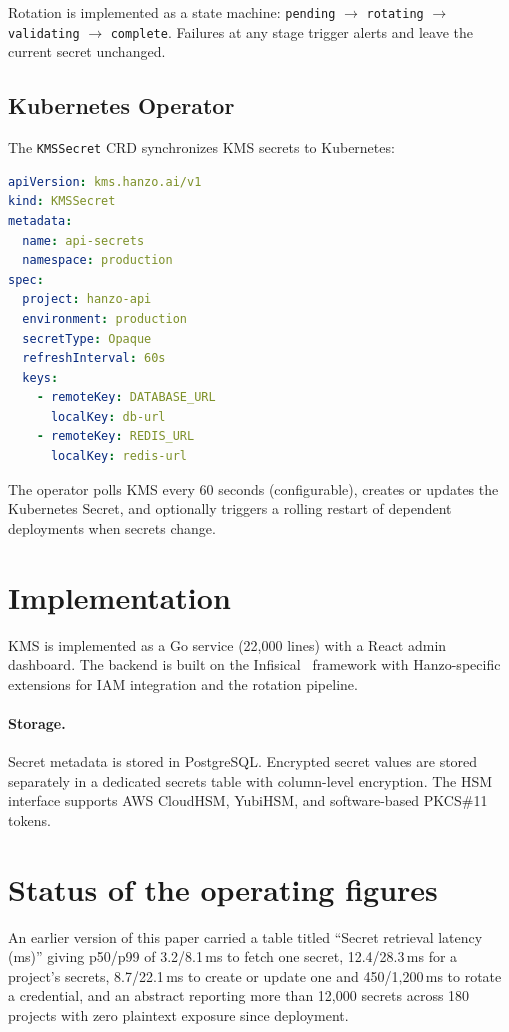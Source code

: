 \documentclass[11pt,twocolumn]{article}
\begin{document}
Rotation is implemented as a state machine: \texttt{pending} $\rightarrow$ \texttt{rotating} $\rightarrow$ \texttt{validating} $\rightarrow$ \texttt{complete}. Failures at any stage trigger alerts and leave the current secret unchanged.

\subsection{Kubernetes Operator}

The \texttt{KMSSecret} CRD synchronizes KMS secrets to Kubernetes:

\begin{lstlisting}[language=YAML]
apiVersion: kms.hanzo.ai/v1
kind: KMSSecret
metadata:
  name: api-secrets
  namespace: production
spec:
  project: hanzo-api
  environment: production
  secretType: Opaque
  refreshInterval: 60s
  keys:
    - remoteKey: DATABASE_URL
      localKey: db-url
    - remoteKey: REDIS_URL
      localKey: redis-url
\end{lstlisting}

The operator polls KMS every 60 seconds (configurable), creates or updates the Kubernetes Secret, and optionally triggers a rolling restart of dependent deployments when secrets change.

\section{Implementation}

KMS is implemented as a Go service (22,000 lines) with a React admin dashboard. The backend is built on the Infisical~\cite{infisical2022} framework with Hanzo-specific extensions for IAM integration and the rotation pipeline.

\paragraph{Storage.} Secret metadata is stored in PostgreSQL. Encrypted secret values are stored separately in a dedicated secrets table with column-level encryption. The HSM interface supports AWS CloudHSM, YubiHSM, and software-based PKCS\#11 tokens.

\section{Status of the operating figures}
\label{sec:figures}

An earlier version of this paper carried a table titled ``Secret retrieval
latency (ms)'' giving p50/p99 of 3.2/8.1\,ms to fetch one secret, 12.4/28.3\,ms
for a project's secrets, 8.7/22.1\,ms to create or update one and
450/1{,}200\,ms to rotate a credential, and an abstract reporting more than
12{,}000 secrets across 180 projects with zero plaintext exposure since
deployment.
\end{document}
